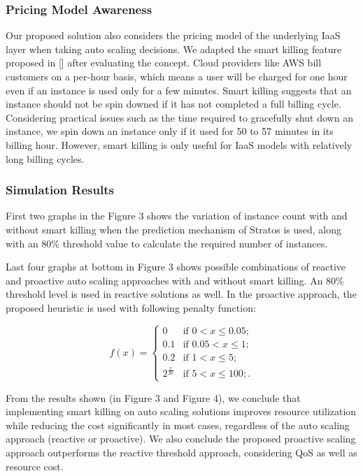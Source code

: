 \subsubsection {Pricing Model Awareness}

Our proposed solution also considers the pricing model of the underlying IaaS layer when taking auto scaling decisions. We adapted the smart killing feature proposed in [\cite{pluggable}] after evaluating the concept. Cloud providers like AWS bill customers on a per-hour basis, which means a user will be charged for one hour even if an instance is used only for a few minutes. Smart killing suggests that an instance should not be spin downed if it has not completed a full billing cycle. Considering practical issues such as the time required to gracefully shut down an instance, we spin down an instance only if it used for 50 to 57 minutes in its billing hour. However, smart killing is only useful for IaaS models with relatively long billing cycles.

\subsubsection{Simulation Results}
First two graphs in the Figure 3 shows the variation of instance count with and without smart killing when the prediction mechanism of Stratos is used, along with an 80\% threshold value to calculate the required number of instances.

Last four graphs at bottom in Figure 3 shows possible combinations of reactive and proactive auto scaling approaches with and without smart killing. An 80\% threshold level is used in reactive solutions as well. In the proactive approach, the proposed heuristic is used with following penalty function:

$$f(x) = \begin{cases} 
0 & \text{if $0 < x \le 0.05$}; \\
0.1 & \text{if $0.05 < x \le 1$}; \\
0.2 & \text{if $1 < x \le 5$};\\
2^{\frac{x}{20}} & \text{if $5 < x \le 100$};.\end{cases} $$

From the results shown (in Figure 3 and Figure 4), we conclude that implementing smart killing on auto scaling solutions improves resource utilization while reducing the cost significantly in most cases, regardless of the auto scaling approach (reactive or proactive). We also conclude the proposed proactive scaling approach outperforms the reactive threshold approach, considering QoS as well as resource cost.

